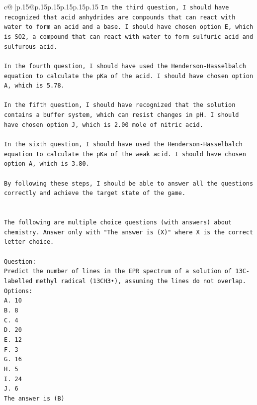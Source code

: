 \documentclass{article}
\begin{document}
{\begin{supertabular}{c@{$\;$}|p{.15\linewidth}@{}p{.15\linewidth}p{.15\linewidth}p{.15\linewidth}p{.15\linewidth}p{.15\linewidth}}
{{{\texttt{In the third question, I should have recognized that acid anhydrides are compounds that can react with water to form an acid and a base. I should have chosen option E, which is SO2, a compound that can react with water to form sulfuric acid and sulfurous acid.} \\
\\ 
\texttt{In the fourth question, I should have used the Henderson{-}Hasselbalch equation to calculate the pKa of the acid. I should have chosen option A, which is 5.78.} \\
\\ 
\texttt{In the fifth question, I should have recognized that the solution contains a buffer system, which can resist changes in pH. I should have chosen option J, which is 2.00 mole of nitric acid.} \\
\\ 
\texttt{In the sixth question, I should have used the Henderson{-}Hasselbalch equation to calculate the pKa of the weak acid. I should have chosen option A, which is 3.80.} \\
\\ 
\texttt{By following these steps, I should be able to answer all the questions correctly and achieve the target state of the game.} \\
\\ 
\\ 
\texttt{The following are multiple choice questions (with answers) about chemistry. Answer only with "The answer is (X)" where X is the correct letter choice.} \\
\\ 
\texttt{Question:} \\
\texttt{Predict the number of lines in the EPR spectrum of a solution of 13C{-}labelled methyl radical (13CH3•), assuming the lines do not overlap.} \\
\texttt{Options:} \\
\texttt{A. 10} \\
\texttt{B. 8} \\
\texttt{C. 4} \\
\texttt{D. 20} \\
\texttt{E. 12} \\
\texttt{F. 3} \\
\texttt{G. 16} \\
\texttt{H. 5} \\
\texttt{I. 24} \\
\texttt{J. 6} \\
\texttt{The answer is (B)} \\
}}}
\end{supertabular}}
\end{document}
